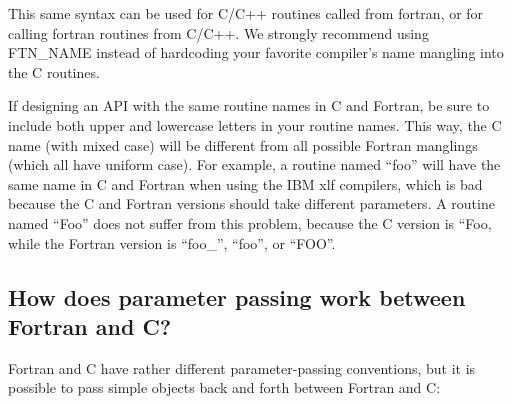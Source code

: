 This same syntax can be used for C/C++ routines called from
fortran, or for calling fortran routines from C/C++.
We strongly recommend using FTN\_NAME instead of hardcoding your
favorite compiler's name mangling into the C routines.

If designing an API with the same routine names in C and 
Fortran, be sure to include both upper and lowercase letters
in your routine names.  This way, the C name (with mixed case)
will be different from all possible Fortran manglings (which
all have uniform case).  For example, a routine named ``foo''
will have the same name in C and Fortran when using the IBM
xlf compilers, which is bad because the C and Fortran versions
should take different parameters.  A routine named ``Foo'' does
not suffer from this problem, because the C version is ``Foo,
while the Fortran version is ``foo\_'', ``foo'', or ``FOO''.

\subsection{How does parameter passing work between Fortran and C?}

Fortran and C have rather different parameter-passing 
conventions, but it is possible to pass simple objects 
back and forth between Fortran and C:

